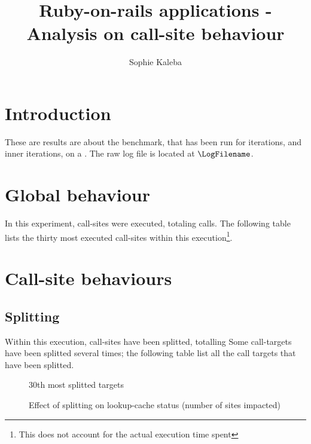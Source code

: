 \documentclass[preprint]{acmart}
\begin{document}
\title{Ruby-on-rails applications - Analysis on call-site behaviour}

\author{Sophie Kaleba}

\maketitle

\section{Introduction}

These are results are about the \BenchmarkName benchmark, that has been run for \NumIterations iterations, and \NumInnerIterations inner iterations, on a \Hihaho.
The raw log file is located at $\LogFilename$. 

\section{Global behaviour}

In this experiment, \NumberCallSites call-sites were executed, totaling \NumberCalls calls.  
The following table lists the thirty most executed call-sites within this execution\footnote{This does not account for the actual execution time spent}.

\MostExecutedCallSite

\section{Call-site behaviours}

\subsection{Splitting}

Within this execution, \NumOfSplittedTargets call-sites have been splitted, totalling \NumsOfSplits
Some call-targets have been splitted several times; the following table list all the call targets that have been splitted.

\newpage

\begin{landscape}
\begin{figure}[h]
  \centering
  \Splitting
  \caption{
    30th most splitted targets}
\end{figure}
\end{landscape}

\begin{figure}[h]
  \centering
  \EffectSplittingSites
  \caption{
    Effect of splitting on lookup-cache status (number of sites impacted)}
\end{figure}
\end{document}
